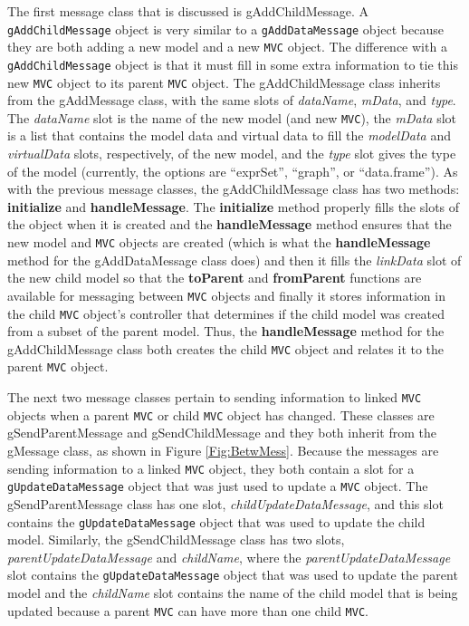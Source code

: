 \documentclass{article}[11pt]
\newcommand{\Rfunction}[1]{{\textbf{#1}}}
\newcommand{\Robject}[1]{{\texttt{#1}}}
\newcommand{\Rslot}[1]{\textsl{#1}}
\newcommand{\Rclass}[1]{\textsf{#1}}
\begin{document}
The first message class that is discussed is
\Rclass{gAddChildMessage}.  A \Robject{gAddChildMessage} object is very
similar to a \Robject{gAddDataMessage} object because they are both adding a
new model and a new \Robject{MVC} object.  The difference with a
\Robject{gAddChildMessage} object is that it must fill in some extra
information to tie this new \Robject{MVC} object to its parent \Robject{MVC}
object.  The \Rclass{gAddChildMessage} class inherits from the
\Rclass{gAddMessage} class, with the same slots of \Rslot{dataName},
\Rslot{mData}, and \Rslot{type}.  The \Rslot{dataName} slot is the name of the
new model (and new \Robject{MVC}), the \Rslot{mData} slot is a list that
contains the
model data and virtual data to fill the \Rslot{modelData} and
\Rslot{virtualData} slots, respectively, of the new model, and the
\Rslot{type} slot gives the type of the model (currently, the options are
``exprSet'', ``graph'', or ``data.frame'').  As with the previous
message classes, the \Rclass{gAddChildMessage} class has two methods:
\Rfunction{initialize} and \Rfunction{handleMessage}.  The
\Rfunction{initialize} method properly fills the slots of the object when it
is created and the \Rfunction{handleMessage} method ensures that the new
model and \Robject{MVC} objects are created (which is what the
\Rfunction{handleMessage} method for the \Rclass{gAddDataMessage} class does)
and then it fills the \Rslot{linkData} slot of the new child model
so that the \Rfunction{toParent} and \Rfunction{fromParent} functions are
available for messaging between \Robject{MVC} objects and finally it stores
information in the child \Robject{MVC} object's controller that determines if
the child model was created from a subset of the parent
model.  Thus, the \Rfunction{handleMessage} method for the
\Rclass{gAddChildMessage} class both creates the child \Robject{MVC} object
and relates it to the parent \Robject{MVC} object. 

The next two message classes pertain to sending information to linked
\Robject{MVC} objects when a parent \Robject{MVC} or child \Robject{MVC}
object has changed.  These classes are \Rclass{gSendParentMessage} and
\Rclass{gSendChildMessage} and they both inherit from the \Rclass{gMessage}
class, as shown in Figure \ref{Fig:BetwMess}.  Because the messages are
sending information to a linked \Robject{MVC} object, they both contain a slot
for a \Robject{gUpdateDataMessage} object that was just used to update a
\Robject{MVC} object.  The \Rclass{gSendParentMessage} class has one slot,
\Rslot{childUpdateDataMessage}, and this slot contains the
\Robject{gUpdateDataMessage} object that was used to update the child
model.  Similarly, the \Rclass{gSendChildMessage} class has two
slots, \Rslot{parentUpdateDataMessage} and \Rslot{childName}, where the
\Rslot{parentUpdateDataMessage} slot contains the \Robject{gUpdateDataMessage}
object that was used to update the parent model and the
\Rslot{childName} slot contains the name of the child model that is
being updated because a parent \Robject{MVC} can have more than one child
\Robject{MVC}.  
\end{document}
